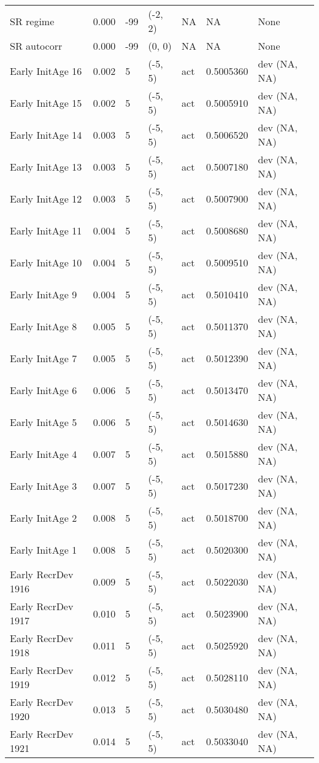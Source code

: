 \documentclass[11pt,
  english,
  letterpaper,
]{article}
\begin{document}
\begin{landscape}
\begin{longtable}[t]{>{\raggedright\arraybackslash}p{7cm}lllll>{\raggedright\arraybackslash}p{4cm}}
SR regime & 0.000 & -99 & (-2, 2) & NA & NA & None\\
SR autocorr & 0.000 & -99 & (0, 0) & NA & NA & None\\
Early InitAge 16 & 0.002 & 5 & (-5, 5) & act & 0.5005360 & dev (NA, NA)\\
Early InitAge 15 & 0.002 & 5 & (-5, 5) & act & 0.5005910 & dev (NA, NA)\\
Early InitAge 14 & 0.003 & 5 & (-5, 5) & act & 0.5006520 & dev (NA, NA)\\
Early InitAge 13 & 0.003 & 5 & (-5, 5) & act & 0.5007180 & dev (NA, NA)\\
Early InitAge 12 & 0.003 & 5 & (-5, 5) & act & 0.5007900 & dev (NA, NA)\\
Early InitAge 11 & 0.004 & 5 & (-5, 5) & act & 0.5008680 & dev (NA, NA)\\
Early InitAge 10 & 0.004 & 5 & (-5, 5) & act & 0.5009510 & dev (NA, NA)\\
Early InitAge 9 & 0.004 & 5 & (-5, 5) & act & 0.5010410 & dev (NA, NA)\\
Early InitAge 8 & 0.005 & 5 & (-5, 5) & act & 0.5011370 & dev (NA, NA)\\
Early InitAge 7 & 0.005 & 5 & (-5, 5) & act & 0.5012390 & dev (NA, NA)\\
Early InitAge 6 & 0.006 & 5 & (-5, 5) & act & 0.5013470 & dev (NA, NA)\\
Early InitAge 5 & 0.006 & 5 & (-5, 5) & act & 0.5014630 & dev (NA, NA)\\
Early InitAge 4 & 0.007 & 5 & (-5, 5) & act & 0.5015880 & dev (NA, NA)\\
Early InitAge 3 & 0.007 & 5 & (-5, 5) & act & 0.5017230 & dev (NA, NA)\\
Early InitAge 2 & 0.008 & 5 & (-5, 5) & act & 0.5018700 & dev (NA, NA)\\
Early InitAge 1 & 0.008 & 5 & (-5, 5) & act & 0.5020300 & dev (NA, NA)\\
Early RecrDev 1916 & 0.009 & 5 & (-5, 5) & act & 0.5022030 & dev (NA, NA)\\
Early RecrDev 1917 & 0.010 & 5 & (-5, 5) & act & 0.5023900 & dev (NA, NA)\\
Early RecrDev 1918 & 0.011 & 5 & (-5, 5) & act & 0.5025920 & dev (NA, NA)\\
Early RecrDev 1919 & 0.012 & 5 & (-5, 5) & act & 0.5028110 & dev (NA, NA)\\
Early RecrDev 1920 & 0.013 & 5 & (-5, 5) & act & 0.5030480 & dev (NA, NA)\\
Early RecrDev 1921 & 0.014 & 5 & (-5, 5) & act & 0.5033040 & dev (NA, NA)\\

\end{longtable}
\end{landscape}
\end{document}
